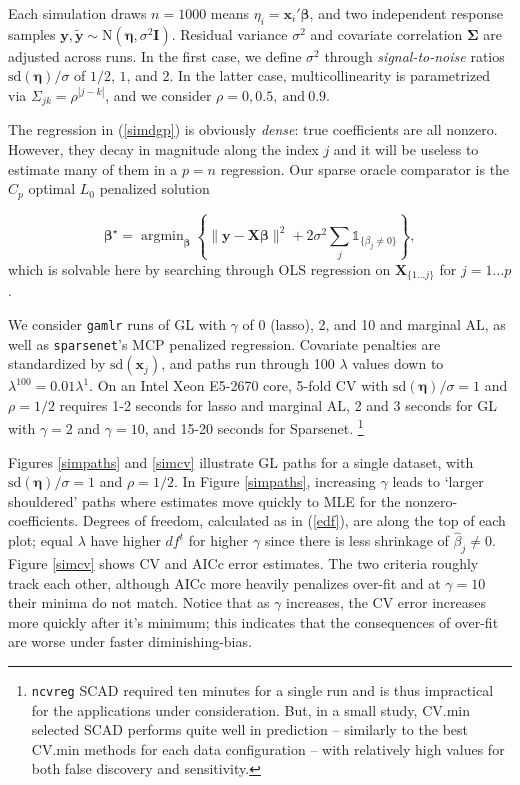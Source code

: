 \documentclass[12pt]{article}
\newcommand{\bs}[1]{\boldsymbol{#1}}
\newcommand{\mr}[1]{\mathrm{#1}}
\newcommand{\bm}[1]{\mathbf{#1}}
\newcommand{\ds}[1]{\mathds{#1}}
\DeclareMathOperator*{\argmin}{argmin}
\begin{document}
\vspace{-.4cm}
\noindent
Each simulation draws $n=1000$ means $\eta_i =
\bm{x}_i'\bs{\beta}$, and two independent response samples 
$\bm{y},\bm{\tilde y} \sim \mr{N}(\bs{\eta},\sigma^2\bm{I})$. Residual
variance $\sigma^2$ and covariate correlation $\bs{\Sigma}$ are adjusted across
runs.  In the first case, we define $\sigma^2$ through {\it signal-to-noise}
ratios $\mr{sd}(\bs{\eta})/\sigma$ of $1/2$, $1$, and $2$.  In the latter
case, multicollinearity is parametrized via $\Sigma_{jk} =
\rho^{|j-k|}$, and we consider $\rho = 0, 0.5,~\text{and}~0.9$.


The regression in (\ref{simdgp}) is obviously {\it dense}:  true
coefficients are all nonzero.  However, they decay in magnitude along the
index $j$ and
it will be useless to estimate many of them in a $p=n$ regression.
Our sparse oracle comparator is the $C_p$ optimal $L_0$ penalized solution

\vspace{-.3cm}
\begin{equation}\label{l0oracle}
\bs{\beta}^{\star} = \argmin_{\bs{\beta}} \left\{ \|\bm{y}-\bm{X}\bs{\beta}\|^2 + 2\sigma^2\sum_j
\ds{1}_{\{\beta_j\neq0\}}\right\},
\end{equation} which is solvable here by searching through
OLS regression on $\bm{X}_{\{1\ldots j\}}$ for $j=1\ldots p$.

We consider {\tt gamlr} runs of GL with $\gamma$
of 0 (lasso), 2, and 10 and marginal AL, as well as
{\tt sparsenet}'s MCP penalized regression.  Covariate penalties are
standardized by $\mr{sd}(\bs{x}_j)$, and paths run through 100
$\lambda$ values down to $\lambda^{100} = 0.01\lambda^1$. On an Intel Xeon
E5-2670 core, 5-fold CV with $\mr{sd}(\bm{\eta})/\sigma=1$
and $\rho=1/2$ requires   1-2 seconds for lasso and marginal  AL, 2 and 3
seconds for GL with $\gamma=2$ and $\gamma=10$, and 15-20 seconds
for Sparsenet.
\footnote{{\tt ncvreg} SCAD required ten minutes for a single run and is thus
impractical for the applications under consideration.  But, in a small study,
CV.min selected SCAD performs quite well in prediction --  similarly to the
best CV.min methods for each data configuration -- with relatively high values
for both false discovery and sensitivity. }


Figures \ref{simpaths} and \ref{simcv} illustrate GL paths for a single
dataset, with  $\mr{sd}(\bm{\eta})/\sigma=1$ and $\rho=1/2$. In Figure
\ref{simpaths}, increasing $\gamma$ leads to `larger shouldered' paths where
estimates move quickly to MLE for the nonzero-coefficients. Degrees of
freedom, calculated as in (\ref{edf}), are along the top of each plot; equal
$\lambda$ have higher $df^t$ for higher $\gamma$ since there is less shrinkage
of $\hat\beta_j\neq0$.  Figure \ref{simcv} shows CV and AICc error estimates.
The two criteria roughly track each other, although AICc more heavily
penalizes over-fit and at $\gamma=10$ their minima do not match.  Notice that
as $\gamma$ increases, the CV error increases more quickly after it's minimum;
this indicates that the consequences of over-fit are worse under faster
diminishing-bias.
\end{document}
